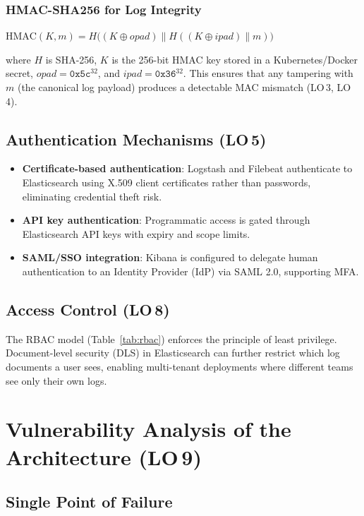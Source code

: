 \documentclass[12pt,a4paper]{report}
\begin{document}
\subsubsection{HMAC-SHA256 for Log Integrity}

$\text{HMAC}(K, m) = H\bigl((K \oplus opad) \| H((K \oplus ipad) \| m)\bigr)$

where $H$ is SHA-256, $K$ is the 256-bit HMAC key stored in a Kubernetes/Docker secret,
$opad = \texttt{0x5c}^{32}$, and $ipad = \texttt{0x36}^{32}$.
This ensures that any tampering with $m$ (the canonical log payload) produces a
detectable MAC mismatch (LO\,3, LO\,4).

\subsection{Authentication Mechanisms (LO\,5)}

\begin{itemize}[leftmargin=1.5em]
    \item \textbf{Certificate-based authentication}: Logstash and Filebeat authenticate
          to Elasticsearch using X.509 client certificates rather than passwords,
          eliminating credential theft risk.
    \item \textbf{API key authentication}: Programmatic access is gated through
          Elasticsearch API keys with expiry and scope limits.
    \item \textbf{SAML/SSO integration}: Kibana is configured to delegate human
          authentication to an Identity Provider (IdP) via SAML 2.0, supporting MFA.
\end{itemize}

\subsection{Access Control (LO\,8)}

The RBAC model (Table~\ref{tab:rbac}) enforces the principle of least privilege.
Document-level security (DLS) in Elasticsearch can further restrict which log documents
a user sees, enabling multi-tenant deployments where different teams see only their own logs.

\section{Vulnerability Analysis of the Architecture (LO\,9)}

\subsection{Single Point of Failure}
\end{document}
